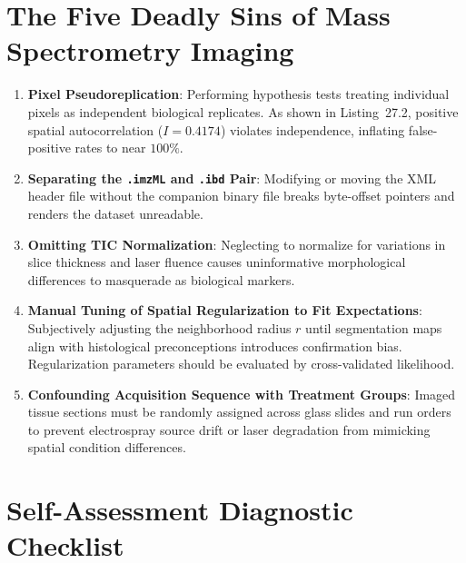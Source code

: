 \documentclass[11pt,twoside,openright]{book}
\begin{document}
\section{The Five Deadly Sins of Mass Spectrometry Imaging}

\begin{enumerate}
    \item \textbf{Pixel Pseudoreplication}: Performing hypothesis tests treating individual pixels as independent biological replicates. As shown in Listing~27.2, positive spatial autocorrelation ($I = 0.4174$) violates independence, inflating false-positive rates to near $100\%$.
    \item \textbf{Separating the \texttt{.imzML} and \texttt{.ibd} Pair}: Modifying or moving the XML header file without the companion binary file breaks byte-offset pointers and renders the dataset unreadable.
    \item \textbf{Omitting TIC Normalization}: Neglecting to normalize for variations in slice thickness and laser fluence causes uninformative morphological differences to masquerade as biological markers.
    \item \textbf{Manual Tuning of Spatial Regularization to Fit Expectations}: Subjectively adjusting the neighborhood radius $r$ until segmentation maps align with histological preconceptions introduces confirmation bias. Regularization parameters should be evaluated by cross-validated likelihood.
    \item \textbf{Confounding Acquisition Sequence with Treatment Groups}: Imaged tissue sections must be randomly assigned across glass slides and run orders to prevent electrospray source drift or laser degradation from mimicking spatial condition differences.
\end{enumerate}

\section{Self-Assessment Diagnostic Checklist}
\end{document}
